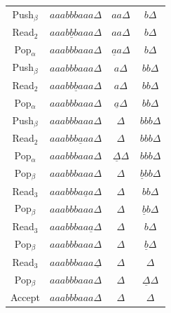 \documentclass[letterpaper, 12 pt]{article}
\begin{document}
\begin{enumerate}
\begin{center}
\begin{tabular}{| c c c c |}
                Push$_\beta$  & $aaabbbaaa                   \Delta $ & $a a \Delta$                & $b \Delta$ \\
                Read$_2$      & $aaab\underline{b}baaa       \Delta $ & $a a \Delta$                & $b \Delta$ \\
                Pop$_\alpha$  & $aaabbbaaa                   \Delta $ & $\underline{a} a \Delta$    & $b \Delta$ \\
                Push$_\beta$  & $aaabbbaaa                   \Delta $ & $a \Delta$                  & $b b \Delta$ \\
                Read$_2$      & $aaabb\underline{b}aaa       \Delta $ & $a \Delta$                  & $b b \Delta$ \\
                Pop$_\alpha$  & $aaabbbaaa                   \Delta $ & $\underline{a} \Delta$      & $b b \Delta$ \\
                Push$_\beta$  & $aaabbbaaa                   \Delta $ & $\Delta$                    & $b b b \Delta$ \\
                Read$_2$      & $aaabbb\underline{a}aa       \Delta $ & $\Delta$                    & $b b b \Delta$ \\
                Pop$_\alpha$  & $aaabbbaaa                   \Delta $ & $\underline{\Delta} \Delta$ & $b b b \Delta$ \\
                Pop$_\beta$   & $aaabbbaaa                   \Delta $ & $\Delta$                    & $\underline{b} b b \Delta$ \\
                Read$_3$      & $aaabbba\underline{a}a       \Delta $ & $\Delta$                    & $b b \Delta$ \\
                Pop$_\beta$   & $aaabbbaaa                   \Delta $ & $\Delta$                    & $\underline{b} b \Delta$ \\
                Read$_3$      & $aaabbbaa\underline{a}       \Delta $ & $\Delta$                    & $b \Delta$ \\
                Pop$_\beta$   & $aaabbbaaa                   \Delta $ & $\Delta$                    & $\underline{b} \Delta$ \\
                Read$_3$      & $aaabbbaaa \underline{\Delta} $       & $\Delta$                    & $\Delta$ \\
                Pop$_\beta$   & $aaabbbaaa                   \Delta $ & $\Delta$                    & $\underline{\Delta} \Delta$ \\
                Accept        & $aaabbbaaa                   \Delta $ & $\Delta$                    & $\Delta$ \\
            \end{tabular}
        \end{center}


\end{enumerate}
\end{document}
